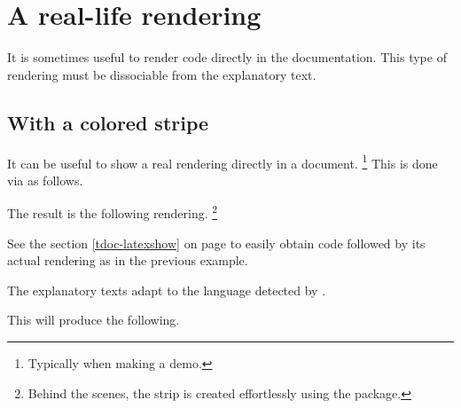 \documentclass[12pt, a4paper]{tutodoc}
\begin{document}
\section{A real-life rendering} \label{tdoc-showcase}

It is sometimes useful to render code directly in the documentation. This type of rendering must be dissociable from the explanatory text.



\subsection{With a colored stripe} \label{tdoc-color-macros}

\begin{tdocexa} 
    It can be useful to show a real rendering directly in a document.
    \footnote{
        Typically when making a demo.
    }
    This is done via  as follows.


    The result is the following rendering.
    \footnote{
        Behind the scenes, the strip is created effortlessly using the  package.
    }
\end{tdocexa}




\smallskip

\begin{tdocrem}
    See the section \ref{tdoc-latexshow} on page \pageref{tdoc-latexshow} to easily obtain code followed by its actual rendering as in the previous example.
\end{tdocrem}


\begin{tdocnote}
    The explanatory texts adapt to the language detected by \thisproj.
\end{tdocnote}




\begin{tdocexa}
    \leavevmode


    This will produce the following.

    \medskip

    
\end{tdocexa}
\end{document}
